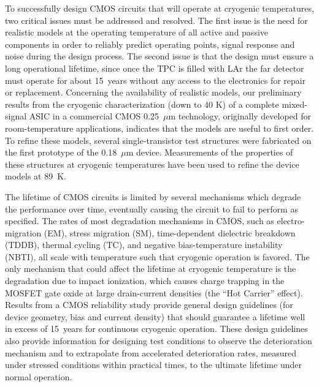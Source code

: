 To successfully design CMOS circuits that will operate at cryogenic 
temperatures, two critical issues must be addressed and resolved. 
The first issue is the need for realistic models at the operating temperature 
of all active and passive components in order to reliably predict operating points,
signal response and noise during the design process.
The second issue is that the design must ensure a long operational lifetime, since once the TPC is filled 
with LAr the far detector must operate for about 15~years without any access to the 
electronics for repair or replacement.
Concerning the availability of realistic models, 
our preliminary results from the cryogenic characterization (down to 40 K) of a complete 
mixed-signal ASIC in a commercial CMOS 0.25~$\mu$m technology, 
originally developed for room-temperature applications, indicates that the models 
are useful to first order.
To refine these models, several 
single-transistor test structures were fabricated on the first prototype of the 0.18~$\mu$m device. 
Measurements of the properties of these structures at cryogenic temperatures 
have been used to refine the device models at 89~K. 

The lifetime of CMOS circuits is limited by several mechanisms which degrade 
the performance over time, eventually causing the circuit to fail to perform as specified. 
The rates of most degradation mechanisms in CMOS, such as electro-migration (EM), 
stress migration (SM), time-dependent dielectric breakdown (TDDB), thermal cycling (TC), 
and negative bias-temperature instability (NBTI), all scale with temperature such that 
cryogenic operation is favored. The only mechanism 
that could affect the lifetime at cryogenic temperature is the degradation due to 
impact ionization, which causes charge trapping in the MOSFET gate oxide at 
large drain-current densities (the ``Hot Carrier'' effect).
Results from a CMOS reliability study
provide general design guidelines (for device geometry, bias and current density) 
that should guarantee a lifetime well in excess of 15~years for continuous cryogenic operation. 
These design guidelines also provide information for designing test conditions to observe the 
deterioration mechanism and to extrapolate from accelerated deterioration rates, 
measured under stressed conditions within practical times, to the ultimate lifetime under normal operation.

